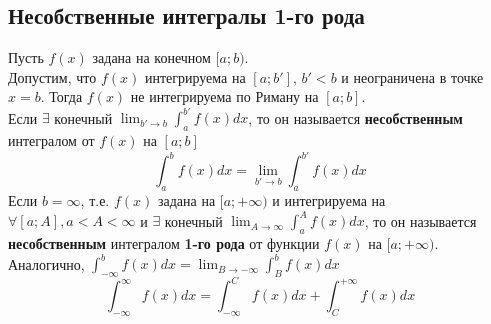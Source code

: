 \documentclass[12pt]{article}
\begin{document}
    \subsection{Несобственные интегралы 1-го рода}
    Пусть $f(x)$ задана на конечном $[a;b)$.\\
    Допустим, что $f(x)$ интегрируема на $[a;b']$, $b'<b$ и неограничена в точке $x=b$. Тогда $f(x)$ не интегрируема по Риману на $[a;b]$.\\
    Если $\exists$ конечный $\lim_{b' \to b} \int_{a}^{b'}f(x)dx$, то он называется \textbf{несобственным} интегралом от $f(x)$ на $[a; b]$
    \[ \int_{a}^{b}f(x)dx=\lim_{b' \to b}\int_{a}^{b'} f(x)dx \]
    Если $b=\infty$, т.е. $f(x)$ задана на $[a; +\infty)$ и интегрируема на $\forall [a;A],a<A<\infty$ и $\exists$ конечный $\lim_{A \to \infty}\int_{a}^{A} f(x)dx$, то он называется \textbf{несобственным} интегралом \textbf{1-го рода} от функции $f(x)$ на $[a;+\infty)$.\\
    Аналогично, $\int_{-\infty}^{b}f(x)dx=\lim_{B \to -\infty} \int_{B}^{b}f(x)dx$\\
    \[ \int_{-\infty}^{\infty} f(x)dx=\int_{-\infty}^{C}f(x)dx+\int_{C}^{+\infty}f(x)dx \]
\end{document}
